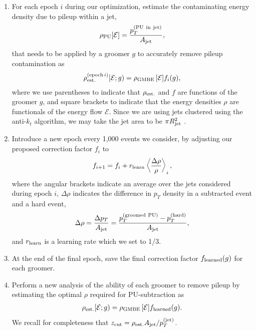 \begin{subappendices}
\begin{enumerate}
    \item
    For each epoch \(i\) during our optimization, estimate the contaminating energy density due to \gls{pileup} within a jet,
    \begin{align}
        \rho_{\rm PU}[\mathcal E] = \frac{p_T^{\rm (PU~in~jet)}}{A_{\rm jet}}
        ,
    \end{align}
    that needs to be applied by a groomer \(g\) to accurately remove \gls{pileup} contamination as
    \begin{align}
        \rho^{{\rm(epoch}\,i)}_{\rm est.}[\mathcal E ; g)
        =
        \rho_{\rm GMBE}\,[\mathcal E] f_i(g)
        ,
    \end{align}
    where we use parentheses to indicate that \(\rho_{\rm est.}\) and \(f\) are functions of the groomer \(g\), and square brackets to indicate that the energy densities \(\rho\) are functionals of the energy flow \(\mathcal E\).
    Since we are using jets clustered using the anti-\(k_t\) algorithm, we may take the jet area to be \(\pi R_{\rm jet}^2\) \cite{Cacciari:2008gp}.

    \item
    Introduce a new epoch every 1,000 events we consider, by adjusting our proposed correction factor \(f_i\) to
    \begin{align}
        f_{i + 1}
        =
        f_i + r_{\rm learn}
        \left\langle \frac{\Delta \rho}{\rho} \right\rangle_i
        \label{eq:epochcorrectionfactor}
        ,
    \end{align}
    where the angular brackets indicate an average over the jets considered during epoch \(i\), \(\Delta \rho\) indicates the difference in \(p_T\) density in a  subtracted event and a hard event,
    \begin{align}
        \Delta \rho
        =
        \frac{\Delta p_T}{A_{\rm jet}}
        =
        \frac{p_T^{\rm(groomed~PU)} - p_T^{\rm(hard)}}{A_{\rm jet}}
        ,
    \end{align}
    and \(r_{\rm learn}\) is a learning rate which we set to 1/3.


    \item
    At the end of the final epoch, save the final correction factor \(f_{\rm learned}(g)\) for each groomer.

    \item
    Perform a new analysis of the ability of each groomer to remove \gls{pileup} by estimating the optimal \(\rho\) required for PU-subtraction as
    \begin{align}
        \rho_{\rm est.}[\mathcal E ; g)
        =
        \rho_{\rm GMBE}\,[\mathcal E] f_{\rm learned}(g)
        .
    \end{align}
    We recall for completeness that \(
    	z_{\rm cut}
	=
	\rho_{\rm est.} A_{\rm jet}/p_T^{(\rm jet)}
    \).


\end{enumerate}
\end{subappendices}
